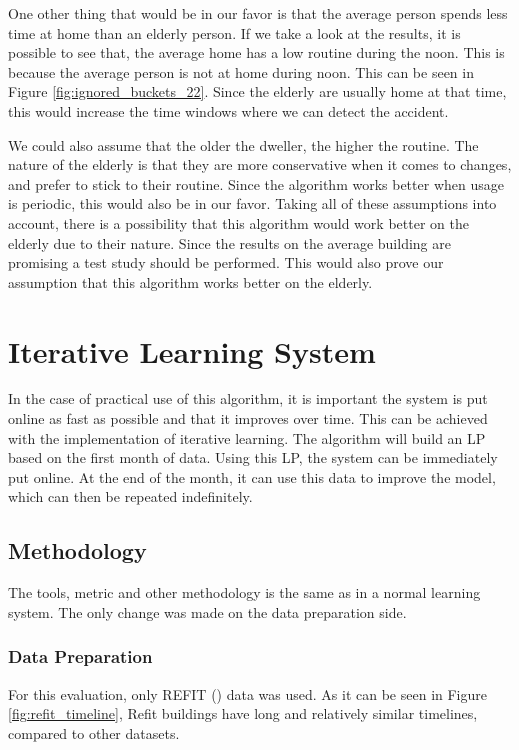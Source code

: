 One other thing that would be in our favor is that the average person spends less time at home than an elderly person. 
If we take a look at the results, it is possible to see that,
the average home has a low routine during the noon. 
This is because the average person is not at home during noon.
This can be seen in Figure \ref{fig:ignored_buckets_22}.
Since the elderly are usually home at that time, this would 
increase the time windows where we can detect the accident.

We could also assume that the older the dweller, the higher the routine. 
The nature of the elderly is that they are more conservative when it comes to changes, and prefer to stick to their routine.
Since the algorithm works better when usage is periodic, this would also be in our favor. 
Taking all of these assumptions into account, 
there is a possibility that this algorithm would work 
better on the elderly due to their nature.
Since the results on the average building are promising
a test study should be performed. 
This would also prove our assumption that this algorithm works 
better on the elderly.

\section{Iterative Learning System}
\label{sec:iter_learning_system}
In the case of practical use of this algorithm, it is 
important the system is put online as fast as possible and that it improves over time. 
This can be achieved with the implementation of iterative learning.
The algorithm will build an LP based on the first month of data.
Using this LP, the system can be immediately put online.
At the end of the month, it can use this data to improve the model, which can then be repeated indefinitely. 
 
\subsection{Methodology}
The tools, metric and other methodology is the same as in a normal learning system.
The only change was made on the data preparation side.

\subsubsection{Data Preparation}
For this evaluation, only REFIT (\cite{REFIT}) data was used. 
As it can be seen in Figure \ref{fig:refit_timeline},
Refit buildings have long and relatively similar timelines,
compared to other datasets.

